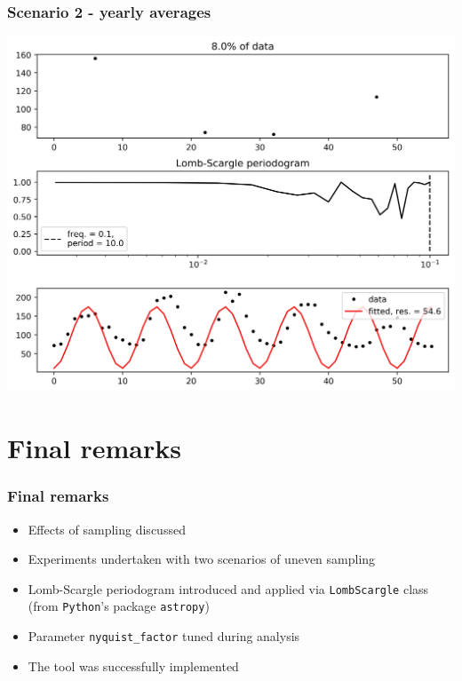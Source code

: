 \documentclass{beamer}
\begin{document}
\begin{frame}
\frametitle{Scenario 2 - yearly averages}
\begin{center}
\includegraphics[scale=0.55]{../scripts/dataset3/periodograms_ny2.0_model1_pg0.92.jpg}
\end{center}
\end{frame}


\section{Final remarks}

\begin{frame}
\frametitle{Final remarks}
\begin{itemize}
\item Effects of sampling discussed
\item Experiments undertaken with two scenarios of uneven sampling
\item Lomb-Scargle periodogram introduced and applied via \texttt{LombScargle} class (from \texttt{Python}'s package \texttt{astropy})
\item Parameter \texttt{nyquist\_factor} tuned during analysis
\item The tool was successfully implemented 
\end{itemize}
\end{frame}
\end{document}
